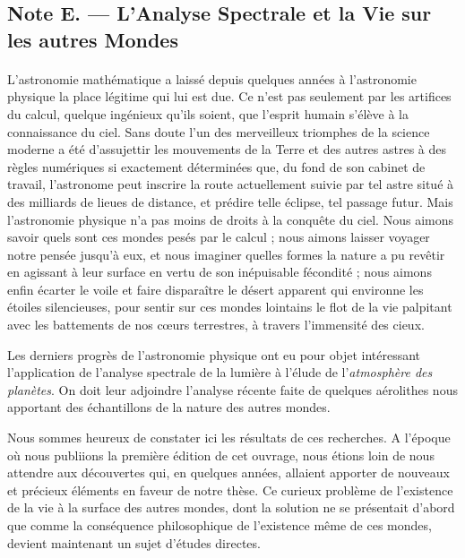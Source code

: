 \documentclass[a4paper, 11pt, oneside]{article}
\begin{document}
\subsection{Note E. --- L'Analyse Spectrale et la Vie sur les autres Mondes}
\paragraph{}
L'astronomie mathématique a laissé depuis quelques années à l'astronomie physique la place légitime qui lui est due. Ce n'est pas seulement par les artifices du calcul, quelque ingénieux qu'ils soient, que l'esprit humain s'élève à la connaissance du ciel. Sans doute l'un des merveilleux triomphes de la science moderne a été d'assujettir les mouvements de la Terre et des autres astres à des règles numériques si exactement déterminées que, du fond de son cabinet de travail, l'astronome peut inscrire la route actuellement suivie par tel astre situé à des milliards de lieues de distance, et prédire telle éclipse, tel passage futur. Mais l'astronomie physique n'a pas moins de droits à la conquête du ciel. Nous aimons savoir quels sont ces mondes pesés par le calcul ; nous aimons laisser voyager notre pensée jusqu'à eux, et nous imaginer quelles formes la nature a pu revêtir en agissant à leur surface en vertu de son inépuisable fécondité ; nous aimons enfin écarter le voile et faire disparaître le désert apparent qui environne les étoiles silencieuses, pour sentir sur ces mondes lointains le flot de la vie palpitant avec les battements de nos cœurs terrestres, à travers l'immensité des cieux.

Les derniers progrès de l'astronomie physique ont eu pour objet intéressant l'application de l'analyse spectrale de la lumière à l'élude de l'\emph{atmosphère des planètes}. On doit leur adjoindre l'analyse récente faite de quelques aérolithes nous apportant des échantillons de la nature des autres mondes.

Nous sommes heureux de constater ici les résultats de ces recherches. A l'époque où nous publiions la première édition de cet ouvrage, nous étions loin de nous attendre aux découvertes qui, en quelques années, allaient apporter de nouveaux et précieux éléments en faveur de notre thèse. Ce curieux problème de l'existence de la vie à la surface des autres mondes, dont la solution ne se présentait d'abord que comme la conséquence philosophique de l'existence même de ces mondes, devient maintenant un sujet d'études directes.
\end{document}
